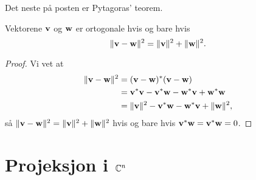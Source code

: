  Det neste på posten er Pytagoras' teorem. 

\begin{thm}
Vektorene $\mathbf{v}$ og $\mathbf{w}$ er ortogonale hvis og bare hvis
\[
\|\mathbf{v}-\mathbf{w}\|^2=\|\mathbf{v}\|^2+\|\mathbf{w}\|^2.
\]
\end{thm}

\begin{proof}
Vi vet at 
\begin{align*}
\|\mathbf{v}-\mathbf{w} \|^2&=(\mathbf{v}-\mathbf{w})^*(\mathbf{v}-\mathbf{w})\\&=\mathbf{v}^*\mathbf{v}-\mathbf{v}^*\mathbf{w}-\mathbf{w}^*\mathbf{v}+\mathbf{w}^*\mathbf{w}\\ & =\|\mathbf{v}\|^2 -\mathbf{v}^*\mathbf{w}-\mathbf{w}^*\mathbf{v}+\|\mathbf{w}\|^2,
\end{align*}
så $\|\mathbf{v}-\mathbf{w}\|^2=\|\mathbf{v}\|^2+\|\mathbf{w}\|^2$ hvis og bare hvis $\mathbf{v}^* \mathbf{w}=\mathbf{v}^* \mathbf{w}=0$.
\end{proof}

 \section*{Projeksjon i $\mathbb{C}^n$}
% 
% 
% 
% 
%
% 
%
%
%
%
%
 
